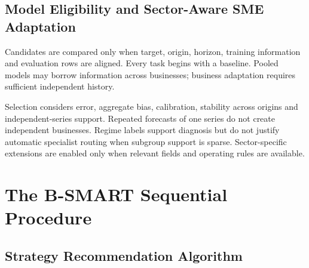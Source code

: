 \documentclass[a4paper,11pt,oneside]{book}
\theoremstyle{plain}
\theoremstyle{definition}
\theoremstyle{remark}
\newcommand{\system}{B-SMART}
\begin{document}
\subsection{Model Eligibility and Sector-Aware SME Adaptation}
Candidates are compared only when target, origin, horizon, training
information and evaluation rows are aligned. Every task begins with a
baseline. Pooled models may borrow information across businesses; business
adaptation requires sufficient independent history.

Selection considers error, aggregate bias, calibration, stability across
origins and independent-series support. Repeated forecasts of one series
do not create independent businesses. Regime labels support diagnosis but
do not justify automatic specialist routing when subgroup support is sparse.
Sector-specific extensions are enabled only when relevant fields and
operating rules are available.

\section{The \system{} Sequential Procedure}
\label{sec:sequential_procedure}


\subsection{Strategy Recommendation Algorithm}
\end{document}
